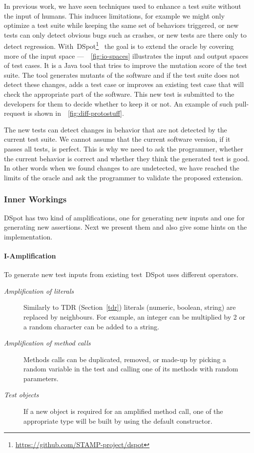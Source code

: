 \documentclass[11pt]{sdm}
\newcommand{\addref}[1]{\colorbox{TealBlue!100}{\textcolor{white}{\textbf{$[$\ifx&#1&\ \else#1\fi$]$}}}}
\newcommand{\dspot}{DSpot\xspace}
\begin{document}
In previous work, we have seen techniques used to enhance a test suite without the input of humans.
This induces limitations, for example we might only optimize a test suite while keeping the same set of behaviors triggered, or new tests can only detect obvious bugs such as crashes, or new tests are there only to detect regression.
With~\dspot{}\footnote{\url{https://github.com/STAMP-project/dspot}}~\cite{baudry2015dspot} the goal is to extend the oracle by covering more of the input space ---~\figurename~\ref{fig:io-spaces} illustrates the input and output spaces of test cases.
It is a Java tool that tries to improve the mutation score of the test suite.
The tool generates mutants of the software and if the test suite does not detect these changes, adds a test case or improves an existing test case that will check the appropriate part of the software.
This new test is submitted to the developers for them to decide whether to keep it or not.
An example of such pull-request is shown in~\figurename~\ref{fig:diff-protostuff}.

The new tests can detect changes in behavior that are not detected by the current test suite.
We cannot assume that the current software version, if it passes all tests, is perfect.
This is why we need to ask the programmer, whether the current behavior is correct and whether they think the generated test is good.
In other words when we found changes to are undetected, we have reached the limits of the oracle and ask the programmer to validate the proposed extension.

\subsubsection{Inner Workings}
\dspot{} has two kind of amplifications, one for generating new inputs and one for generating new assertions.
Next we present them and also give some hints on the implementation.

\paragraph{I-Amplification}
To generate new test inputs from existing test~\dspot{} uses different operators.
\begin{description}
  \item[\textit{Amplification of literals}] Similarly to TDR (Section~\ref{tdr}) literals (numeric, boolean, string) are replaced by neighbours. For example, an integer can be multiplied by 2 or a random character can be added to a string.
  \item[\textit{Amplification of method calls}] Methods calls can be duplicated, removed, or made-up by picking a random variable in the test and calling one of its methods with random parameters.
  \item[\textit{Test objects}] If a new object is required for an amplified method call, one of the appropriate type will be built by using the default constructor.
\end{description}
\end{document}
